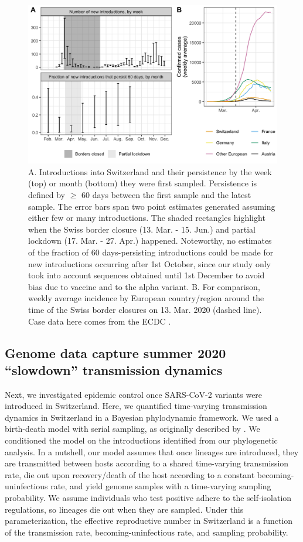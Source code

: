 \documentclass[11pt,twoside,lineno]{pnas-new} %
\begin{document}
\begin{figure}[H]
\centering
\includegraphics[width=0.75\linewidth]{figures/introductions_and_persistence.png}
\caption{A. Introductions into Switzerland and their persistence by the week (top) or month (bottom) they were first sampled. Persistence is defined by $\geq$ 60 days between the first sample and the latest sample. The error bars span two point estimates generated assuming either few or many introductions. The shaded rectangles highlight when the Swiss border closure (13. Mar. - 15. Jun.) and partial lockdown (17. Mar. - 27. Apr.) happened. Noteworthy, no estimates of the fraction of 60 days-persisting introductions could be made for new introductions occurring after 1st October, since our study only took into account sequences obtained until 1st December to avoid bias due to vaccine and to the alpha variant. B. For comparison, weekly average incidence by European country/region around the time of the Swiss border closures on 13. Mar. 2020 (dashed line). Case data here comes from the ECDC \cite{ECDC}.}
\label{fig:chain-longevity}
\end{figure}

\subsection{Genome data capture summer 2020 ``slowdown'' transmission dynamics}

Next, we investigated epidemic control once SARS-CoV-2 variants were introduced in Switzerland. Here, we quantified time-varying transmission dynamics in Switzerland in a Bayesian phylodynamic framework. We used a birth-death model with serial sampling, as originally described by \cite{stadler_2010_bds}. We conditioned the model on the introductions identified from our phylogenetic analysis. In a nutshell, our model assumes that once lineages are introduced, they are transmitted between hosts according to a shared time-varying transmission rate, die out upon recovery/death of the host according to a constant becoming-uninfectious rate, and yield genome samples with a time-varying sampling probability. We assume individuals who test positive adhere to the self-isolation regulations, so lineages die out when they are sampled. Under this parameterization, the effective reproductive number in Switzerland is a function of the transmission rate, becoming-uninfectious rate, and sampling probability.
\end{document}
